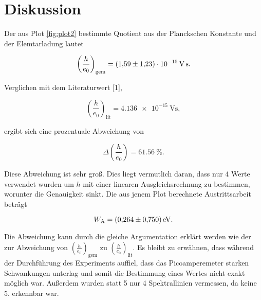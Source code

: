 \section{Diskussion}
\label{sec:Diskussion}

Der aus Plot \ref{fig:plot2} bestimmte Quotient aus der Planckschen Konstante und der Elemtarladung lautet 

\begin{equation*}
\left(\frac{h}{e_0}\right)_\text{gem} = \SI{1.59+-1.23e-15}{\volt\second}.
\end{equation*}

Verglichen mit dem Literaturwert [1],

\begin{equation*}
\left(\frac{h}{e_0}\right)_\text{lit} = \SI{4.136e-15}{\volt\second},
\end{equation*}

ergibt sich eine prozentuale Abweichung von

\begin{equation*}
\Delta\left(\frac{h}{e_0}\right) = \SI{61.56}{\percent}.
\end{equation*}

Diese Abweichung ist sehr groß. Dies liegt vermutlich daran, dass nur 4 Werte 
verwendet wurden um $h$ mit einer linearen Ausgleichsrechnung zu bestimmen, worunter
die Genauigkeit sinkt. 
Die aus jenem Plot berechnete Austrittsarbeit beträgt 

\begin{equation*}
W_\text{A} = \SI{0.264+-0.750}{\eV}.
\end{equation*}

Die Abweichung kann durch die gleiche Argumentation erklärt werden
wie der zur Abweichung von $\left(\frac{h}{e_0}\right)_\text{gem}$ zu $\left(\frac{h}{e_0}\right)_\text{lit}$.
Es bleibt zu erwähnen, dass während der Durchführung des Experiments auffiel, dass das Picoamperemeter
starken Schwankungen unterlag und somit die Bestimmung eines Wertes nicht exakt möglich war. 
Außerdem wurden statt 5 nur 4 Spektrallinien vermessen, da keine 5. erkennbar war. 
